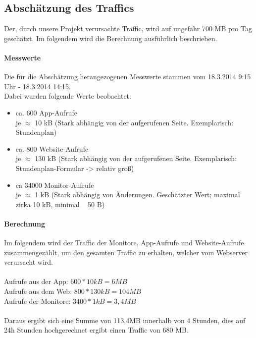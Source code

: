 \subsection{Abschätzung des Traffics}
Der, durch unsere Projekt verursachte Traffic, wird auf ungefähr 700 MB pro Tag geschätzt. Im folgendem wird die Berechnung ausführlich beschrieben.\\

\paragraph{Messwerte\\}
Die für die Abschätzung herangezogenen Messwerte stammen vom 18.3.2014 9:15 Uhr - 18.3.2014 14:15.\\
Dabei wurden folgende Werte beobachtet:

\begin{itemize}
	\item ca. 600 App-Aufrufe\\
	je $ \approx  $ 10 kB (Stark abhängig von der aufgerufenen Seite. Exemplarisch: Stundenplan)
	\item ca.  800 Website-Aufrufe\\
	je $ \approx  $ 130 kB (Stark abhängig von der aufgerufenen Seite. Exemplarisch: Stundenplan-Formular -> relativ groß)
	\item ca 34000 Monitor-Aufrufe\\
	je $ \approx  $   1 kB (Stark abhängig von Änderungen. Geschätzter Wert; maximal zirka 10 kB, minimal ~ 50 B)
\end{itemize}

\paragraph{Berechnung\\}

Im folgendem wird der Traffic der Monitore, App-Aufrufe und Website-Aufrufe zusammengezählt, um den gesamten Traffic zu erhalten, welcher vom Webserver verursacht wird.\\
\\
Aufrufe aus der App: $ 600 \ast 10 kB = 6MB $\\
Aufrufe aus dem Web: $ 800 \ast 130 kB = 104 MB $\\
Aufrufe der Monitore: $ 3400 \ast 1kB = 3,4MB $\\
\\
Daraus ergibt sich eine Summe von 113,4MB innerhalb von 4 Stunden, dies auf 24h Stunden hochgerechnet ergibt einen Traffic von 680 MB.\\

